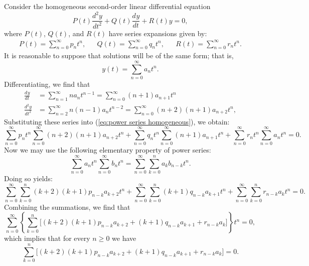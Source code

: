 \documentclass{myart}
\newcommand{\eq}[1]{(\ref{eq:#1})}
\newcommand{\deriv}[3][]{\frac{d^{#1}#2}{d#3^{#1}}}
\begin{document}
Consider the homogeneous second-order linear differential equation
\begin{equation} \label{eq:power series homogeneous}
P(t) \deriv[2]{y}{t} + Q(t) \deriv{y}{t} + R(t) y = 0,
\end{equation}
where $P(t)$, $Q(t)$, and $R(t)$ have series expansions given by:
\begin{align*}
P(t) = \sum_{n=0}^\infty p_n t^n, && Q(t) = \sum_{n=0}^\infty q_n t^n, && R(t) = \sum_{n=0}^\infty r_n t^n.
\end{align*}
It is reasonable to suppose that solutions will be of the same form; that is,
\begin{equation*}
y(t) = \sum_{n=0}^\infty a_n t^n.
\end{equation*}
Differentiating, we find that
\begin{align*}
\deriv{y}{t} &= \sum_{n=1}^\infty n a_n t^{n-1} = \sum_{n=0}^\infty (n+1) a_{n+1} t^n \\
\deriv[2]{y}{t} &= \sum_{n=2}^\infty n(n-1) a_n t^{n-2} = \sum_{n=0}^\infty (n+2)(n+1) a_{n+2} t^n,
\end{align*}
Substituting these series into \eq{power series homogeneous}, we obtain:
\begin{equation*}
\sum_{n=0}^\infty p_n t^n \sum_{n=0}^\infty (n+2)(n+1) a_{n+2} t^n + \sum_{n=0}^\infty q_n t^n \sum_{n=0}^\infty (n+1) a_{n+1} t^n + \sum_{n=0}^\infty r_n t^n \sum_{n=0}^\infty a_n t^n = 0.
\end{equation*}
Now we may use the following elementary property of power series:
\begin{equation*}
\sum_{n=0}^\infty a_n t^n \sum_{n=0}^\infty b_n t^n = \sum_{n=0}^\infty \sum_{k=0}^n a_k b_{n-k} t^n.
\end{equation*}
Doing so yields:
\begin{equation*}
\sum_{n=0}^\infty \sum_{k=0}^n (k+2)(k+1) p_{n-k} a_{k+2} t^n + \sum_{n=0}^\infty \sum_{k=0}^n (k+1) q_{n-k} a_{k+1} t^n + \sum_{n=0}^\infty \sum_{k=0}^n r_{n-k} a_k t^n = 0.
\end{equation*}
Combining the summations, we find that
\begin{equation*}
\sum_{n=0}^\infty \left\{\sum_{k=0}^n \bigg[(k+2)(k+1) p_{n-k} a_{k+2} + (k+1) q_{n-k} a_{k+1} + r_{n-k} a_k\bigg]\right\} t^n = 0,
\end{equation*}
which implies that for every $n \geq 0$ we have
\begin{equation}
\sum_{k=0}^n \bigg[(k+2)(k+1) p_{n-k} a_{k+2} + (k+1) q_{n-k} a_{k+1} + r_{n-k} a_k\bigg] = 0.
\end{equation}
\end{document}
